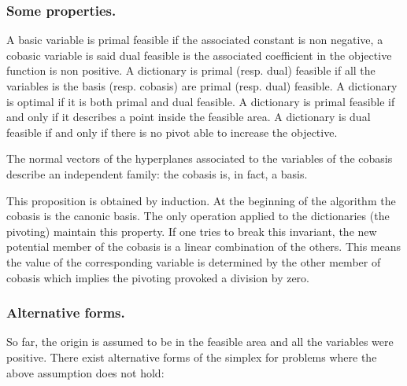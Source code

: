 



\subsubsection{Some properties.}
A basic variable is primal feasible if the associated constant is non negative, a cobasic variable is said dual feasible is the associated coefficient in the objective function is non positive. A dictionary is primal (resp. dual) feasible if all the variables is the basis (resp. cobasis) are primal (resp. dual) feasible. A dictionary is optimal if it is both primal and dual feasible. A dictionary is primal feasible if and only if it describes a point inside the feasible area. A dictionary is dual feasible if and only if there is no pivot able to increase the objective.

\begin{proposition}
The normal vectors of the hyperplanes associated to the variables of the cobasis describe an independent family: the cobasis is, in fact, a basis.
\end{proposition}
\vspace*{-0.1cm}
This proposition is obtained by induction. At the beginning of the algorithm the cobasis is the canonic basis. The only operation applied to the dictionaries (the pivoting) maintain this property. If one tries to break this invariant, the new potential member of the cobasis is a linear combination of the others. This means the value of the corresponding variable is determined by the other member of cobasis which implies the pivoting provoked a division by zero.


\subsubsection{Alternative forms.}
\label{section_altsimplex}
So far, the origin is assumed to be in the feasible area and all the variables were positive. There exist alternative forms of the simplex for problems where the above assumption does not hold:

